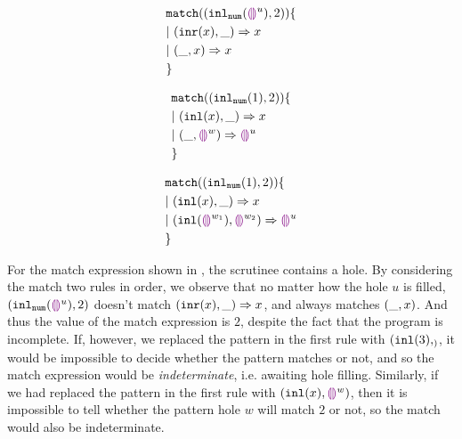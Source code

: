 \documentclass[acmsmall,screen,review,nonacm]{acmart}
\theoremstyle{slplain}
\numberwithin{thm}{section}
\begin{document}
\begin{figure}[h]
\begin{minipage}{0.33\textwidth}
\begin{equation}
\begin{split}
  &\mathtt{match} ((\mathtt{inl}_{\mathtt{num}}({\textcolor{violet}{\llparenthesis}\textcolor{violet}{\rrparenthesis}^{u}}) , 2)) \{\\
  &|~ (\mathtt{inr}(x) , \_) \Rightarrow x \\
  &|~ (\_ , x) \Rightarrow x \\
  &\}
\end{split}
\label{eq:complete}
\end{equation}
\end{minipage}%
\begin{minipage}{0.33\textwidth}
\begin{equation}
\begin{split}
  &\mathtt{match} ((\mathtt{inl}_{\mathtt{num}}({1}) , 2)) \{\\
  &|~ (\mathtt{inl}(x) , \_) \Rightarrow x \\
  &|~ (\_ , \textcolor{violet}{\llparenthesis}\textcolor{violet}{\rrparenthesis}^{w}) \Rightarrow \textcolor{violet}{\llparenthesis}\textcolor{violet}{\rrparenthesis}^{u} \\
  &\}
\end{split}
\label{eq:pathole-exhaustive}
\end{equation}
\end{minipage}%
\begin{minipage}{0.33\textwidth}
\begin{equation}
\begin{split}
  &\mathtt{match} ((\mathtt{inl}_{\mathtt{num}}({1}) , 2)) \{\\
  &|~ (\mathtt{inl}(x) , \_) \Rightarrow x \\
  &|~ (\mathtt{inl}(\textcolor{violet}{\llparenthesis}\textcolor{violet}{\rrparenthesis}^{w_1}) , \textcolor{violet}{\llparenthesis}\textcolor{violet}{\rrparenthesis}^{w_2}) \Rightarrow \textcolor{violet}{\llparenthesis}\textcolor{violet}{\rrparenthesis}^{u} \\
  &\}
\end{split}
\label{eq:pathole-redundant}
\end{equation}
\end{minipage}%
\end{figure}

For the match expression shown in , the scrutinee contains a hole.
By considering the match two rules in order, we observe that
no matter how the hole $u$ is filled, $(\mathtt{inl}_{\mathtt{num}}({\textcolor{violet}{\llparenthesis}\textcolor{violet}{\rrparenthesis}^{u}}) , 2)$ doesn't match $(\mathtt{inr}(x) , \_) \Rightarrow x$,
and always matches $(\_ , x)$. And thus the value of the match expression is $2$, despite the fact that the program is incomplete.
If, however, we replaced the pattern in the first rule with $(\mathtt{inl}(3), _)$, it would be impossible to decide whether the pattern matches
or not, and so the match expression would be \emph{indeterminate}, i.e. awaiting hole filling. Similarly, if we had replaced the 
pattern in the first rule with $(\mathtt{inl}(x), \textcolor{violet}{\llparenthesis}\textcolor{violet}{\rrparenthesis}^{w})$, then it is impossible to tell whether the pattern hole $w$ will match $2$ or not,
so the match would also be indeterminate.
\end{document}
